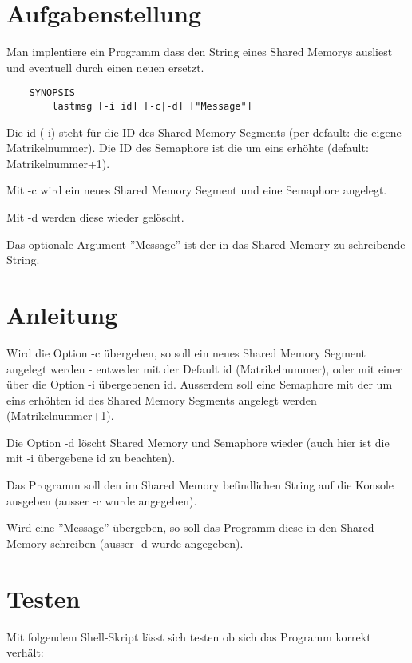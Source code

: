 




\section*{Aufgabenstellung}


Man implentiere ein Programm dass den String eines Shared Memorys ausliest und
eventuell durch einen neuen ersetzt.
\begin{verbatim}
    SYNOPSIS
        lastmsg [-i id] [-c|-d] ["Message"]
\end{verbatim}

Die id (-i) steht für die ID des Shared Memory Segments (per default: die eigene Matrikelnummer).
Die ID des Semaphore ist die um eins erhöhte (default: Matrikelnummer+1).

Mit -c wird ein neues Shared Memory Segment und eine Semaphore angelegt.

Mit -d werden diese wieder gelöscht.

Das optionale Argument ''Message'' ist der in das Shared Memory zu schreibende String.

\section*{Anleitung}

Wird die Option -c übergeben, so soll ein neues Shared Memory Segment angelegt
werden - entweder mit der Default id (Matrikelnummer), oder mit einer über die Option -i
übergebenen id. Ausserdem soll eine Semaphore mit der um eins erhöhten id des
Shared Memory Segments angelegt werden (Matrikelnummer+1).

Die Option -d löscht Shared Memory und Semaphore wieder (auch hier ist die mit
-i übergebene id zu beachten).

Das Programm soll den im Shared Memory befindlichen String auf die Konsole
ausgeben (ausser -c wurde angegeben).

Wird eine ''Message'' übergeben, so soll das Programm diese in den Shared
Memory schreiben (ausser -d wurde angegeben).

\section*{Testen}

Mit folgendem Shell-Skript lässt sich testen ob sich das Programm korrekt
verhält:


